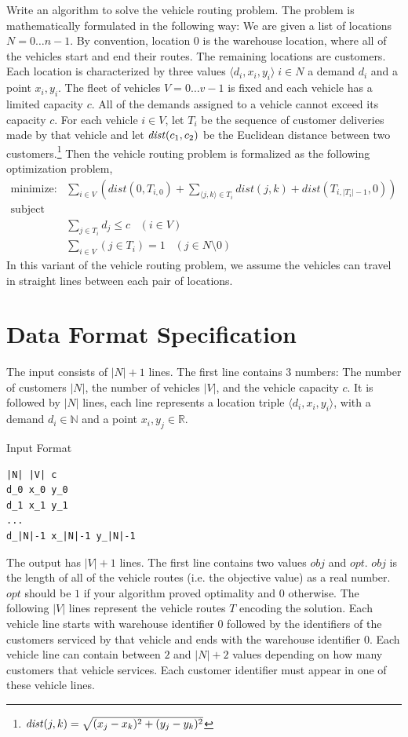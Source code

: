 \documentclass[11pt]{article}
\begin{document}
Write an algorithm to solve the vehicle routing problem.  The problem is mathematically formulated in the following way:  We are given a list of locations $N = 0 \ldots n-1$.  By convention, location 0 is the warehouse location, where all of the vehicles start and end their routes.  The remaining locations are customers.  Each location is characterized by three values  $\langle d_i,x_i,y_i \rangle \; i \in N$ a demand $d_i$ and a point $x_i,y_i$.  The fleet of vehicles $V = 0 \ldots v-1$ is fixed and each vehicle has a limited capacity $c$.  All of the demands assigned to a vehicle cannot exceed its capacity $c$.  For each vehicle $i \in V$, let $T_i$ be the sequence of customer deliveries made by that vehicle and let ${\it dist}(c_1,c_2)$ be the Euclidean distance between two customers.\footnote{${\it dist}(j,k) = \sqrt{(x_{j} - x_{k})^2 + (y_{j} - y_{k})^2}$}  Then the vehicle routing problem is formalized as the following optimization problem,
$$
\begin{array}{ll}
\mbox{minimize:} & \displaystyle \sum_{i \in V} \left( dist(0, T_{i,0}) + \sum_{\langle j,k \rangle \in T_{i}} dist(j, k) + dist(T_{i,|T_i|-1}, 0) \right)\\
\mbox{subject to:} & \\
     & \displaystyle \sum_{j \in T_{i}} d_j \leq c \;\;\; (i \in V) \\
     & \displaystyle \sum_{i \in V}  (j \in T_{i}) = 1 \;\;\; (j \in N \setminus 0) 
\end{array}
$$
In this variant of the vehicle routing problem, we assume the vehicles can travel in straight lines between each pair of locations.

\section{Data Format Specification}

The input consists of $|N| + 1$ lines.  The first line contains 3 numbers: The number of customers $|N|$, the number of vehicles $|V|$, and the vehicle capacity $c$.
It is followed by $|N|$ lines, each line represents a location triple $\langle d_i,x_i, y_i \rangle$, with a demand $d_i \in \mathbb{N}$ and a point  $x_i, y_j \in \mathbb{R}$.

\vspace{0.2cm}
\noindent
Input Format
\vspace{-0.2cm}
\begin{Verbatim}[frame=single]
|N| |V| c
d_0 x_0 y_0
d_1 x_1 y_1
...
d_|N|-1 x_|N|-1 y_|N|-1
\end{Verbatim}
%
The output has $|V|+1$ lines.  The first line contains two values $obj$ and $opt$.  $obj$ is the length of all of the vehicle routes (i.e. the objective value) as a real number.  $opt$ should be $1$ if your algorithm proved optimality and $0$ otherwise.  The following $|V|$ lines represent the vehicle routes $T$ encoding the solution.  Each vehicle line starts with warehouse identifier $0$ followed by the identifiers of the customers serviced by that vehicle and ends with the warehouse identifier $0$.  Each vehicle line can contain between $2$ and $|N|+2$ values depending on how many customers that vehicle services.  Each customer identifier must appear in one of these vehicle lines.
\end{document}
